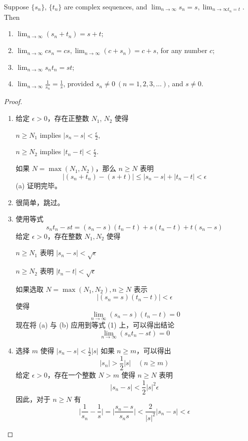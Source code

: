 \documentclass[../poma-notes.tex]{subfiles}
\begin{document}
\begin{theorem}
  Suppose $\{s_n\}$, $\{t_n\}$ are complex sequences, and $\lim_{n \to \infty} s_n = s,\lim_{n \to \infty t_n = t}$.
  Then
  \begin{enumerate}[label=(\alph*)]
    \item $\lim_{n \to \infty}(s_n + t_n) = s + t$;
    \item $\lim_{n \to \infty} cs_n = cs, \lim_{n \to \infty} (c + s_n) = c + s$, for any number $c$;
    \item $\lim_{n \to \infty} s_n t_n = st$;
    \item $\lim_{n \to \infty} \frac{1}{s_n} = \frac{1}{s}$, provided $s_n \ne 0\ (n=1,2,3,\dots)$, and $s \ne 0$.
  \end{enumerate}
\end{theorem}

\begin{proof}
  \begin{enumerate}[label=(\alph*)]
    \item 给定 $\epsilon > 0$，存在正整数 $N_1$, $N_2$ 使得
          \begin{center}
            $n \ge N_1$ implies $|s_n - s| < \frac{\epsilon}{2}$,
          \end{center}
          \begin{center}
            $n \ge N_2$ implies $|t_n - t| < \frac{\epsilon}{2}$.
          \end{center}
          如果 $N = \max(N_1, N_2)$，那么 $n \ge N$ 表明
          \[|(s_n + t_n) - (s + t)| \le |s_n - s| + |t_n - t| < \epsilon\]
          (a) 证明完毕。
    \item 很简单，跳过。
    \item 使用等式
          \begin{equation}
            s_n t_n - st = (s_n - s)(t_n - t) + s(t_n - t) + t(s_n - s)
          \end{equation}
          给定 $\epsilon > 0$，存在整数 $N_1, N_2$ 使得
          \begin{center}
            $n \ge N_1$ 表明 $|s_n - s| < \sqrt{\epsilon}$
          \end{center}
          \begin{center}
            $n \ge N_2$ 表明 $|t_n - t| < \sqrt{\epsilon}$
          \end{center}
          如果选取 $N = \max (N_1, N_2), n \ge N$ 表示
          \[|(s_n = s)(t_n - t)| < \epsilon\]
          使得
          \[\lim_{n \to \infty}(s_n - s)(t_n - t) = 0\]
          现在将 (a) 与 (b) 应用到等式 (1) 上，可以得出结论
          \[\lim_{n \to \infty}(s_n t_n - st) = 0\]
    \item 选择 $m$ 使得 $|s_n - s| < \frac{1}{2}|s|$ 如果 $n \ge m$，可以得出
          \[|s_n| > \frac{1}{2}|s| \quad (n \ge m)\]
          给定 $\epsilon > 0$，存在一个整数 $N > m$ 使得 $n \ge N$ 表明
          \[|s_n - s| < \frac{1}{2}|s|^2 \epsilon\]
          因此，对于 $n \ge N$ 有
          \[\biggl|\frac{1}{s_n}-\frac{1}{s}\biggr|=\biggl|\frac{s_n-s}{s_n s}\biggr|<\frac{2}{|s|^2}|s_n-s|<\epsilon\]
  \end{enumerate}
\end{proof}
\end{document}
